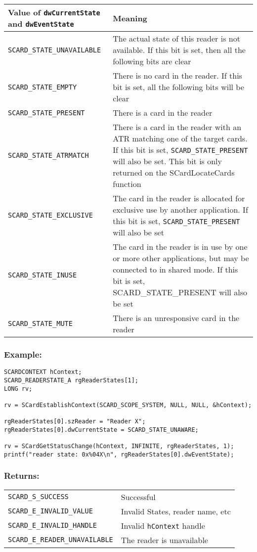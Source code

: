 \documentclass[a4paper,12pt]{article}
\newcommand{\example}{\subsubsection{Example:}}
\newcommand{\returns}{\subsubsection{Returns:}}
\begin{document}
\begin{tabular}{|p{5cm}|p{10.5cm}|}
\hline
Value of \texttt{dwCurrentState} and \texttt{dwEventState} & Meaning \\
\hline
\hline
\texttt{SCARD\_STATE\_UNAVAILABLE} & The actual state of this reader is
not available. If this bit is set, then all the following bits are clear\\

\texttt{SCARD\_STATE\_EMPTY} & There is no card in the reader. If this
bit is set, all the following bits will be clear\\

\texttt{SCARD\_STATE\_PRESENT} & There is a card in the reader\\
\texttt{SCARD\_STATE\_ATRMATCH} & There is a card in the reader with an
ATR matching one of the target cards. If this bit is set,
\texttt{SCARD\_STATE\_PRESENT} will also be set. This bit is only
returned on the SCardLocateCards function\\

\texttt{SCARD\_STATE\_EXCLUSIVE} & The card in the reader is allocated
for exclusive use by another application. If this bit is set,
\texttt{SCARD\_STATE\_PRESENT} will also be set\\

\texttt{SCARD\_STATE\_INUSE} & The card in the reader is in use by one
or more other applications, but may be connected to in shared mode.  If
this bit is set, SCARD\_STATE\_PRESENT will also be set\\

\texttt{SCARD\_STATE\_MUTE} & There is an unresponsive card in the reader\\
\hline
\end{tabular}

\example

\begin{verbatim}
SCARDCONTEXT hContext;
SCARD_READERSTATE_A rgReaderStates[1];
LONG rv;

rv = SCardEstablishContext(SCARD_SCOPE_SYSTEM, NULL, NULL, &hContext);

rgReaderStates[0].szReader = "Reader X";
rgReaderStates[0].dwCurrentState = SCARD_STATE_UNAWARE;

rv = SCardGetStatusChange(hContext, INFINITE, rgReaderStates, 1);
printf("reader state: 0x%04X\n", rgReaderStates[0].dwEventState);
\end{verbatim}


\returns

\begin{tabular}{ll}
\texttt{SCARD\_S\_SUCCESS}			& Successful\\
\texttt{SCARD\_E\_INVALID\_VALUE}		& Invalid States, reader name, etc\\
\texttt{SCARD\_E\_INVALID\_HANDLE}		& Invalid \texttt{hContext} handle\\
\texttt{SCARD\_E\_READER\_UNAVAILABLE} 	& The reader is unavailable\\
\end{tabular}
\end{document}
